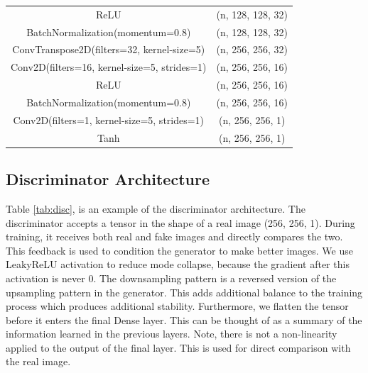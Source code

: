 \begin{center}
\begin{table}[H]
\begin{tabular}{c|c}
            ReLU         & (n, 128, 128, 32)\\
            BatchNormalization(momentum=0.8) & (n, 128, 128, 32)\\
            ConvTranspose2D(filters=32, kernel-size=5) & (n, 256, 256, 32)\\
            Conv2D(filters=16, kernel-size=5, strides=1)       & (n, 256, 256, 16)\\
            ReLU         & (n, 256, 256, 16)\\
            BatchNormalization(momentum=0.8) & (n, 256, 256, 16)\\
            Conv2D(filters=1, kernel-size=5, strides=1)       & (n, 256, 256, 1)\\
            Tanh         & (n, 256, 256, 1)\\
        \end{tabular}
        \label{tab:gen}
    \end{table}
\end{center}


\subsection{Discriminator Architecture}
\hspace{0.5in}Table \ref{tab:disc}, is an example of the discriminator architecture. The discriminator accepts a tensor in the shape of a real image (256, 256, 1). During training, it receives both real and fake images and directly compares the two. This feedback is used to condition the generator to make better images. We use LeakyReLU\cite{leaky_relu} activation to reduce mode collapse, because the gradient after this activation is never 0. The downsampling pattern is a reversed version of the upsampling pattern in the generator. This adds additional balance to the training process which produces additional stability. Furthermore, we flatten the tensor before it enters the final Dense layer. This can be thought of as a summary of the information learned in the previous layers. Note, there is not a non-linearity applied to the output of the final layer. This is used for direct comparison with the real image. 


